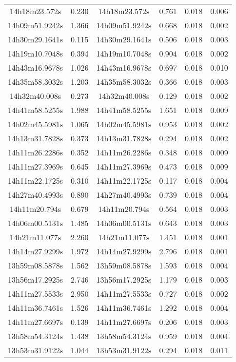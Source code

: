 \begin{table}
\begin{tabular}{cccccc}
14h18m23.572s & 0.230 & 14h18m23.572s & 0.761 & 0.018 & 0.006 \\
14h09m51.9242s & 1.366 & 14h09m51.9242s & 0.668 & 0.018 & 0.002 \\
14h30m29.1641s & 0.115 & 14h30m29.1641s & 0.506 & 0.018 & 0.003 \\
14h19m10.7048s & 0.394 & 14h19m10.7048s & 0.904 & 0.018 & 0.002 \\
14h43m16.9678s & 1.026 & 14h43m16.9678s & 0.697 & 0.018 & 0.010 \\
14h35m58.3032s & 1.203 & 14h35m58.3032s & 0.366 & 0.018 & 0.003 \\
14h32m40.008s & 0.273 & 14h32m40.008s & 0.129 & 0.018 & 0.002 \\
14h41m58.5255s & 1.988 & 14h41m58.5255s & 1.651 & 0.018 & 0.009 \\
14h02m45.5981s & 1.065 & 14h02m45.5981s & 0.953 & 0.018 & 0.002 \\
14h13m31.7828s & 0.373 & 14h13m31.7828s & 0.294 & 0.018 & 0.002 \\
14h11m26.2286s & 0.352 & 14h11m26.2286s & 0.348 & 0.018 & 0.009 \\
14h11m27.3969s & 0.645 & 14h11m27.3969s & 0.473 & 0.018 & 0.009 \\
14h11m22.1725s & 0.310 & 14h11m22.1725s & 0.117 & 0.018 & 0.004 \\
14h27m40.4993s & 0.890 & 14h27m40.4993s & 0.739 & 0.018 & 0.004 \\
14h11m20.794s & 0.679 & 14h11m20.794s & 0.564 & 0.018 & 0.003 \\
14h06m00.5131s & 1.485 & 14h06m00.5131s & 0.643 & 0.018 & 0.003 \\
14h21m11.077s & 2.260 & 14h21m11.077s & 1.451 & 0.018 & 0.001 \\
14h14m27.9299s & 1.972 & 14h14m27.9299s & 2.796 & 0.018 & 0.001 \\
13h59m08.5878s & 1.562 & 13h59m08.5878s & 1.593 & 0.018 & 0.004 \\
13h56m17.2925s & 2.746 & 13h56m17.2925s & 1.179 & 0.018 & 0.003 \\
14h11m27.5533s & 2.950 & 14h11m27.5533s & 0.727 & 0.018 & 0.002 \\
14h11m36.7461s & 1.526 & 14h11m36.7461s & 1.292 & 0.018 & 0.004 \\
14h11m27.6697s & 0.139 & 14h11m27.6697s & 0.206 & 0.018 & 0.003 \\
13h58m54.3124s & 1.438 & 13h58m54.3124s & 0.959 & 0.018 & 0.004 \\
13h53m31.9122s & 1.044 & 13h53m31.9122s & 0.294 & 0.018 & 0.011 \\

\end{tabular}
\end{table}
